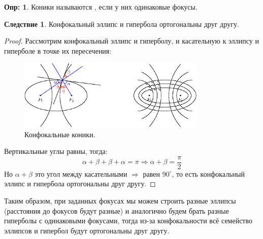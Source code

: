\documentclass[12pt]{article}
\theoremstyle{definition}
\newtheorem{defn}{Опр:}
\newtheorem{corollary}{Следствие}
\begin{document}
\begin{defn}
	Коники называются , если у них одинаковые фокусы.
\end{defn}

\begin{corollary}
	Конфокальный эллипс и гипербола ортогональны друг другу.
\end{corollary}
\begin{proof}
	Рассмотрим конфокальный эллипс и гиперболу, и касательную к эллипсу и гиперболе в точке их пересечения:
	\begin{figure}[H]
		\centering
		\includegraphics[width=0.8\textwidth]{ANGL1_20.eps}
		\caption{Конфокальные коники.}
		\label{1_20}
	\end{figure}
	Вертикальные углы равны, тогда:
	$$
		\alpha + \beta + \beta + \alpha = \pi \Rightarrow \alpha + \beta = \dfrac{\pi}{2}
	$$
	Но $\alpha + \beta$ это угол между касательными $\Rightarrow$ равен $90^\circ$, то есть конфокальный эллипс и гипербола ортогональны друг другу.
\end{proof}
Таким образом, при заданных фокусах мы можем строить разные эллипсы (расстояния до фокусов будут разные) и аналогично будем брать разные гиперболы с одинаковыми фокусами, тогда из-за конфокальности всё семейство эллипсов и гипербол будут ортогональны друг другу.
\end{document}
